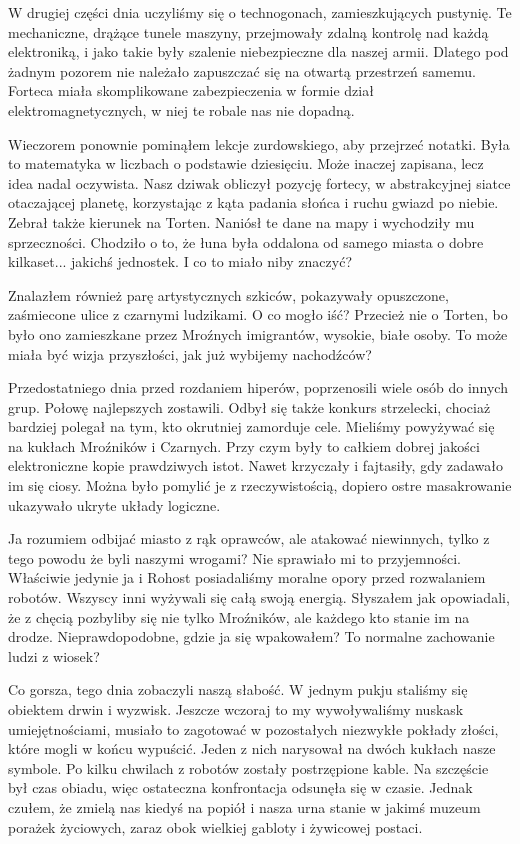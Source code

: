 W drugiej części dnia uczyliśmy się o technogonach, zamieszkujących pustynię.
Te mechaniczne, drążące tunele maszyny, przejmowały zdalną kontrolę nad każdą elektroniką, i jako takie były szalenie niebezpieczne dla naszej armii.
Dlatego pod żadnym pozorem nie należało zapuszczać się na otwartą przestrzeń samemu.
Forteca miała skomplikowane zabezpieczenia w formie dział elektromagnetycznych, w niej te robale nas nie dopadną.

Wieczorem ponownie pominąłem lekcje zurdowskiego, aby przejrzeć notatki.
Była to matematyka w liczbach o podstawie dziesięciu. Może inaczej zapisana, lecz idea nadal oczywista.
Nasz dziwak obliczył pozycję fortecy, w abstrakcyjnej siatce otaczającej planetę, korzystając z kąta padania słońca i ruchu gwiazd po niebie.
Zebrał także kierunek na Torten.
Naniósł te dane na mapy i wychodziły mu sprzeczności.
Chodziło o to, że łuna była oddalona od samego miasta o dobre kilkaset... jakichś jednostek.
I co to miało niby znaczyć?

Znalazłem również parę artystycznych szkiców, pokazywały opuszczone, zaśmiecone ulice z czarnymi ludzikami.
O co mogło iść? Przecież nie o Torten, bo było ono zamieszkane przez Mroźnych imigrantów, wysokie, białe osoby.
To może miała być wizja przyszłości, jak już wybijemy nachodźców?

Przedostatniego dnia przed rozdaniem hiperów, poprzenosili wiele osób do innych grup.
Połowę najlepszych zostawili.
Odbył się także konkurs strzelecki, chociaż bardziej polegał na tym, kto okrutniej zamorduje cele.
Mieliśmy powyżywać się na kukłach Mroźników i Czarnych.
Przy czym były to całkiem dobrej jakości elektroniczne kopie prawdziwych istot.
Nawet krzyczały i fajtasiły, gdy zadawało im się ciosy.
Można było pomylić je z rzeczywistością, dopiero ostre masakrowanie ukazywało ukryte układy logiczne.

Ja rozumiem odbijać miasto z rąk oprawców, ale atakować niewinnych, tylko z tego powodu że byli naszymi wrogami?
Nie sprawiało mi to przyjemności.
Właściwie jedynie ja i Rohost posiadaliśmy moralne opory przed rozwalaniem robotów.
Wszyscy inni wyżywali się całą swoją energią.
Słyszałem jak opowiadali, że z chęcią pozbyliby się nie tylko Mroźników, ale każdego kto stanie im na drodze. 
Nieprawdopodobne, gdzie ja się wpakowałem? To normalne zachowanie ludzi z wiosek?

Co gorsza, tego dnia zobaczyli naszą słabość.
W jednym pukju staliśmy się obiektem drwin i wyzwisk.
Jeszcze wczoraj to my wywoływaliśmy nuskask umiejętnościami, musiało to zagotować w pozostałych niezwykłe pokłady złości, które mogli w końcu wypuścić.
Jeden z nich narysował na dwóch kukłach nasze symbole. Po kilku chwilach z robotów zostały postrzępione kable.
Na szczęście był czas obiadu, więc ostateczna konfrontacja odsunęła się w czasie.
Jednak czułem, że zmielą nas kiedyś na popiół i nasza urna stanie w jakimś muzeum porażek życiowych, zaraz obok wielkiej gabloty i żywicowej postaci.

